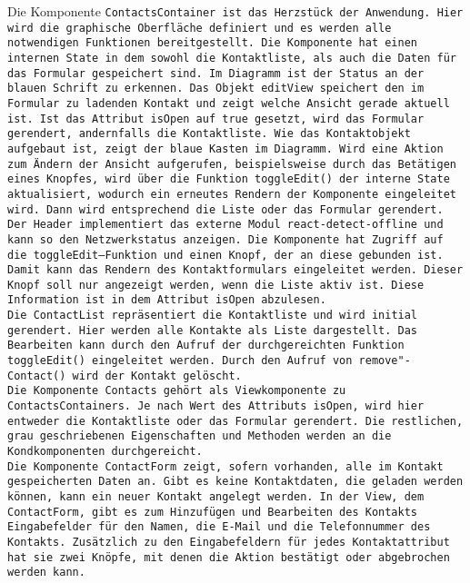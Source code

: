 %
%
Die Komponente \tt{ContactsContainer} ist das Herzstück der Anwendung.
Hier wird die graphische Oberfläche definiert und es werden alle notwendigen Funktionen bereitgestellt.
Die Komponente hat einen internen State in dem sowohl die Kontaktliste, als auch die Daten für das Formular gespeichert sind.
Im Diagramm ist der Status an der blauen Schrift zu erkennen.
Das Objekt \tt{editView} speichert den im Formular zu ladenden Kontakt und zeigt welche Ansicht gerade aktuell ist.
Ist das Attribut \tt{isOpen} auf \tt{true} gesetzt, wird das Formular gerendert, andernfalls die Kontaktliste.
Wie das Kontaktobjekt aufgebaut ist, zeigt der blaue Kasten im Diagramm.
Wird eine Aktion zum Ändern der Ansicht aufgerufen, beispielsweise durch das Betätigen eines Knopfes, wird über die Funktion \tt{toggleEdit()} der interne State aktualisiert, wodurch ein erneutes Rendern der Komponente eingeleitet wird. Dann wird entsprechend die Liste oder das Formular gerendert.\\
%
Der \tt{Header} implementiert das externe Modul \tt{react-detect-offline} und kann so den Netzwerkstatus anzeigen.
Die Komponente hat Zugriff auf die \tt{toggleEdit}--Funktion und einen Knopf, der an diese gebunden ist.
Damit kann das Rendern des Kontaktformulars eingeleitet werden.
Dieser Knopf soll nur angezeigt werden, wenn die Liste aktiv ist. Diese Information ist in dem Attribut \tt{isOpen} abzulesen.\\
Die \tt{ContactList} repräsentiert die Kontaktliste und wird initial gerendert. Hier werden alle Kontakte als Liste dargestellt.
Das Bearbeiten kann durch den Aufruf der durchgereichten Funktion \tt{toggleEdit()} eingeleitet werden.
Durch den Aufruf von \tt{remove"-Contact()} wird der Kontakt gelöscht.\\
%
Die Komponente \tt{Contacts} gehört als Viewkomponente zu \tt{ContactsContainers}. Je nach Wert des Attributs \tt{isOpen}, wird hier entweder die Kontaktliste oder das Formular gerendert. Die restlichen, grau geschriebenen Eigenschaften und Methoden werden an die Kondkomponenten durchgereicht.\\
%
Die Komponente \tt{ContactForm} zeigt, sofern vorhanden, alle im Kontakt gespeicherten Daten an.
Gibt es keine Kontaktdaten, die geladen werden können, kann ein neuer Kontakt angelegt werden.
In der View, dem \tt{ContactForm}, gibt es zum Hinzufügen und Bearbeiten des Kontakts Eingabefelder für den Namen, die E-Mail und die Telefonnummer des Kontakts.
Zusätzlich zu den Eingabefeldern für jedes Kontaktattribut hat sie zwei Knöpfe, mit denen die Aktion bestätigt oder abgebrochen werden kann.\\

